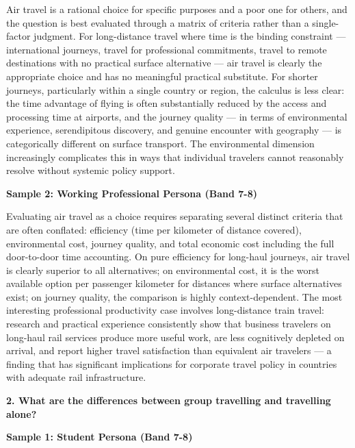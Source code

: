 Air travel is a rational choice for specific purposes and a poor one for others, and the question is best evaluated through a matrix of criteria rather than a single-factor judgment. For long-distance travel where time is the binding constraint — international journeys, travel for professional commitments, travel to remote destinations with no practical surface alternative — air travel is clearly the appropriate choice and has no meaningful practical substitute. For shorter journeys, particularly within a single country or region, the calculus is less clear: the time advantage of flying is often substantially reduced by the access and processing time at airports, and the journey quality — in terms of environmental experience, serendipitous discovery, and genuine encounter with geography — is categorically different on surface transport. The environmental dimension increasingly complicates this in ways that individual travelers cannot reasonably resolve without systemic policy support.

\textbf{Sample 2: Working Professional Persona (Band 7-8)}

Evaluating air travel as a choice requires separating several distinct criteria that are often conflated: efficiency (time per kilometer of distance covered), environmental cost, journey quality, and total economic cost including the full door-to-door time accounting. On pure efficiency for long-haul journeys, air travel is clearly superior to all alternatives; on environmental cost, it is the worst available option per passenger kilometer for distances where surface alternatives exist; on journey quality, the comparison is highly context-dependent. The most interesting professional productivity case involves long-distance train travel: research and practical experience consistently show that business travelers on long-haul rail services produce more useful work, are less cognitively depleted on arrival, and report higher travel satisfaction than equivalent air travelers — a finding that has significant implications for corporate travel policy in countries with adequate rail infrastructure.

\separator

\begin{ieltsquestion}
\textbf{2. What are the differences between group travelling and travelling alone?}
\end{ieltsquestion}
\textbf{Sample 1: Student Persona (Band 7-8)}

